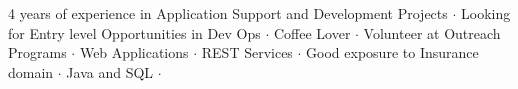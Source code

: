 

\begin{cvparagraph}
4 years of experience in Application Support and Development Projects ${\cdotp}$ Looking for Entry level Opportunities in Dev Ops ${\cdotp}$ Coffee Lover ${\cdotp}$ Volunteer at Outreach Programs ${\cdotp}$ Web Applications ${\cdotp}$ REST Services ${\cdotp}$ Good exposure to Insurance domain ${\cdotp}$ Java and SQL ${\cdotp}$
\end{cvparagraph}
